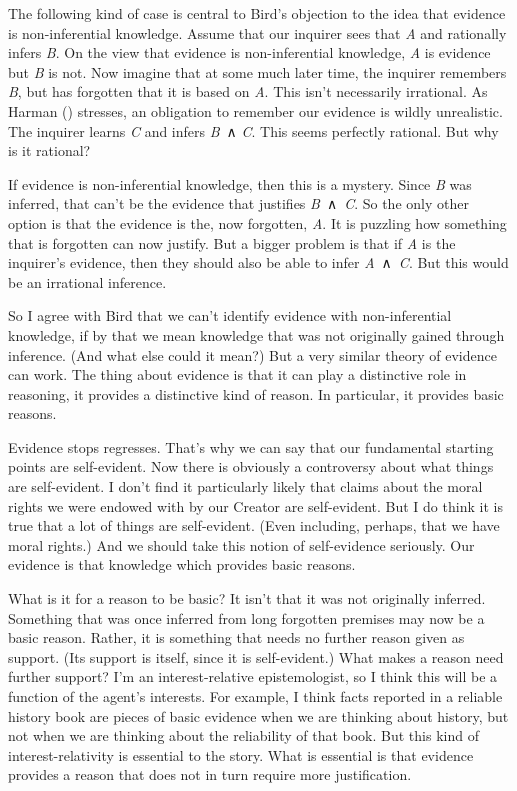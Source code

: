 \documentclass[
  12pt,
  letterpaper,
]{scrbook}
\begin{document}
The following kind of case is central to Bird's objection to the idea
that evidence is non-inferential knowledge. Assume that our inquirer
sees that \emph{A} and rationally infers \emph{B}. On the view that
evidence is non-inferential knowledge, \emph{A} is evidence but \emph{B}
is not. Now imagine that at some much later time, the inquirer remembers
\emph{B}, but has forgotten that it is based on \emph{A}. This isn't
necessarily irrational. As Harman ()
stresses, an obligation to remember our evidence is wildly unrealistic.
The inquirer learns \emph{C} and infers \emph{B}~∧ \emph{C}. This seems
perfectly rational. But why is it rational?

If evidence is non-inferential knowledge, then this is a mystery. Since
\emph{B} was inferred, that can't be the evidence that justifies
\emph{B}~∧~\emph{C}. So the only other option is that the evidence is
the, now forgotten, \emph{A}. It is puzzling how something that is
forgotten can now justify. But a bigger problem is that if \emph{A} is
the inquirer's evidence, then they should also be able to infer
\emph{A}~∧~\emph{C}. But this would be an irrational inference.

So I agree with Bird that we can't identify evidence with
non-inferential knowledge, if by that we mean knowledge that was not
originally gained through inference. (And what else could it mean?) But
a very similar theory of evidence can work. The thing about evidence is
that it can play a distinctive role in reasoning, it provides a
distinctive kind of reason. In particular, it provides basic reasons.

Evidence stops regresses. That's why we can say that our fundamental
starting points are self-evident. Now there is obviously a controversy
about what things are self-evident. I don't find it particularly likely
that claims about the moral rights we were endowed with by our Creator
are self-evident. But I do think it is true that a lot of things are
self-evident. (Even including, perhaps, that we have moral rights.) And
we should take this notion of self-evidence seriously. Our evidence is
that knowledge which provides basic reasons.

What is it for a reason to be basic? It isn't that it was not originally
inferred. Something that was once inferred from long forgotten premises
may now be a basic reason. Rather, it is something that needs no further
reason given as support. (Its support is itself, since it is
self-evident.) What makes a reason need further support? I'm an
interest-relative epistemologist, so I think this will be a function of
the agent's interests. For example, I think facts reported in a reliable
history book are pieces of basic evidence when we are thinking about
history, but not when we are thinking about the reliability of that
book. But this kind of interest-relativity is essential to the story.
What is essential is that evidence provides a reason that does not in
turn require more justification.
\end{document}
